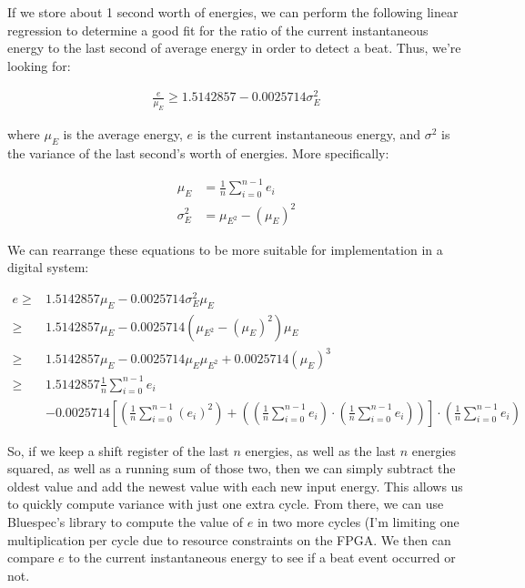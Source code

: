 \documentclass[letterpaper]{article}
\begin{document}
        If we store about 1 second worth of energies, we can perform the following
        linear regression to determine a good fit for the ratio of the current
        instantaneous energy to the last second of average energy in order to
        detect a beat.  Thus, we're looking for:

        \begin{align}
            \frac{e}{\mu_E} \geq 1.5142857 - 0.0025714 \sigma^2_E
        \end{align}

        where $\mu_E$ is the average energy, $e$ is the current instantaneous
        energy, and $\sigma^2$ is the variance of the last second's worth of
        energies.  More specifically:

        \begin{align}
            \mu_E &= \frac{1}{n} \sum_{i=0}^{n-1} e_i \\
            \sigma^2_E &= \mu_{E^2} - (\mu_E)^2
        \end{align}

        We can rearrange these equations to be more suitable for implementation in
        a digital system:

        \begin{align}
            e \geq & 1.5142857 \mu_E  - 0.0025714 \sigma^2_E \mu_E \\
            \geq & 1.5142857 \mu_E
                    - 0.0025714 (\mu_{E^2} - (\mu_E)^2) \mu_E \\
            \geq & 1.5142857 \mu_E
                    - 0.0025714 \mu_E \mu_{E^2} 
                    + 0.0025714 (\mu_E)^3 \\
            \geq & 1.5142857 \frac{1}{n} \sum_{i=0}^{n-1} e_i \\
                & - 0.0025714 \left[
                                    \left(\frac{1}{n} \sum_{i=0}^{n-1} (e_i)^2\right) +
                                    \left(
                                        \left(\frac{1}{n} \sum_{i=0}^{n-1} e_i\right) \cdot
                                        \left(\frac{1}{n} \sum_{i=0}^{n-1} e_i\right)
                                    \right)
                                \right] \cdot
                                \left(\frac{1}{n} \sum_{i=0}^{n-1} e_i\right)
        \end{align}


        So, if we keep a shift register of the last $n$ energies, as well as the
        last $n$ energies squared, as well as a running sum of those two, then we
        can simply subtract the oldest value and add the newest value with each new
        input energy.  This allows us to quickly compute variance with just one
        extra cycle.  From there, we can use Bluespec's  library to
        compute the value of $e$ in two more cycles (I'm limiting one
        multiplication per cycle due to resource constraints on the FPGA.  We then
        can compare $e$ to the current instantaneous energy to see if a beat event
        occurred or not.
\end{document}

